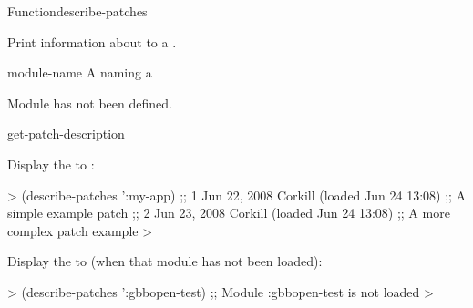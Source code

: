 \documentclass[10pt,twoside,english,pdftex]{article}
\begin{document}

\begin{functiondoc}{Function}{describe-patches}{}
%

\fnsyntax 

\fnpurpose Print information about   to a .

\fnpackage {}

\fnmodule {}

\fnargs
\begin{args}{module-name}
 A  naming a 
\end{args}

\fnerrors Module  has not been defined.\\

\begin{alsos}{get-patch-description}
\also[patch]
\end{alsos}

\fnexamples
%
Display the  to  :
%
\W\supp
\begin{example}
  > (describe-patches ':my-app)
  ;; 1      Jun 22, 2008 Corkill (loaded Jun 24 13:08)
  ;;           A simple example patch
  ;; 2      Jun 23, 2008 Corkill (loaded Jun 24 13:08)
  ;;           A more complex patch example
  >
\end{example}

Display the  to   (when that
module has not been loaded):
%
\W\supp
\begin{example}
  > (describe-patches ':gbbopen-test)
  ;; Module :gbbopen-test is not loaded
  >
\end{example}

\end{functiondoc}

\end{document}
